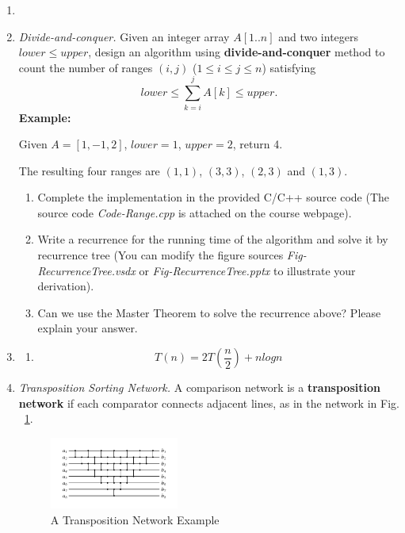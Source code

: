 \documentclass[12pt,a4paper]{article}
\makeatletter
\newtheorem*{solution}{Solution}
\theoremstyle{definition}
\renewenvironment{solution}[1][Solution] {\par\pushQED{\qed}\normalfont\topsep6\p@\@plus6\p@\relax\trivlist\item[\hskip\labelsep\bfseries#1\@addpunct{.}]\ignorespaces}{\popQED\endtrivlist\@endpefalse} \makeatother
\makeatother
\begin{document}
\begin{enumerate}
\begin{solution}
\begin{enumerate}
\end{enumerate}
\end{solution}
\item
\textit{Divide-and-conquer.} Given an integer array $A[1..n]$ and two integers $lower \le upper$, design an algorithm using \textbf{divide-and-conquer} method to count the number of ranges $(i,j)$ ($1 \leq i \leq j \leq n$) satisfying
$$
    lower \leq \sum_{k=i}^{j}{A[k]} \leq upper.
$$
\textbf{Example:}

Given $A = [1,-1,2]$, $lower = 1$, $upper = 2$, return 4.

The resulting four ranges are $(1,1)$, $(3,3)$, $(2,3)$ and $(1,3)$.

\begin{enumerate}
\item
Complete the implementation in the provided C/C++ source code {\color{blue}(The source code \emph{Code-Range.cpp} is attached on the course webpage)}.
\item
Write a recurrence for the running time of the algorithm and solve it by recurrence tree {\color{blue}(You can modify the figure sources \emph{Fig-RecurrenceTree.vsdx} or \emph{Fig-RecurrenceTree.pptx} to illustrate your derivation)}.
\item
Can we use the Master Theorem to solve the recurrence above? Please explain your answer.
\end{enumerate}

\begin{solution}
\begin{enumerate}
\item
$$
T(n) = 2T(\frac{n}{2}) + nlogn
$$
\end{enumerate}
\end{solution}
\item
\textit{Transposition Sorting Network.} A comparison network is a \textbf{transposition network}  if each comparator connects adjacent lines, as in the network in Fig. ~\ref{Fig-Transposition}.

\begin{figure}[htbp]
    \centering
    \includegraphics[width=0.4\textwidth]{Fig-Transposition.pdf}
    \caption{A Transposition Network Example}\label{Fig-Transposition}
\end{figure}


\end{enumerate}
\end{document}
